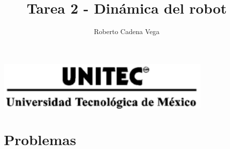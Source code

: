 



\title{ Tarea 2 - Dinámica del robot }

\author{Roberto Cadena Vega} %

\date{ } %




\maketitle %
\begin{marginfigure}
	\includegraphics[width=0.8\textwidth]{../images/UNITEC.png}
\end{marginfigure}

\section{Problemas}

